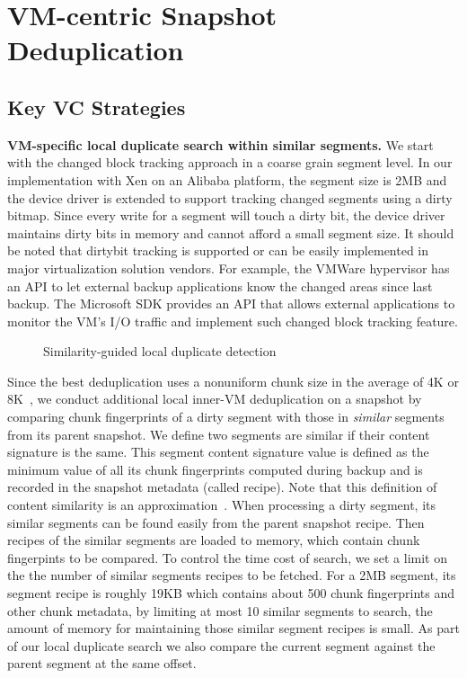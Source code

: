 \section{VM-centric Snapshot Deduplication}
\label{sect:deduplication}

\subsection{Key VC  Strategies}
\label{sect:vc-strategies}
\textbf{VM-specific local duplicate search within similar segments.}
We start with the changed block tracking approach in a coarse grain segment level.
In our implementation with Xen on an Alibaba platform, the segment size is 2MB
and the device driver is extended to support tracking changed segments using a dirty bitmap. 
Since every write for a segment will touch a dirty bit, the device driver maintains dirty bits in memory
and cannot afford a small segment size.
It should be noted that dirtybit tracking is supported or can be easily implemented in 
major virtualization solution vendors. For example,
the VMWare hypervisor has an API to let external backup applications know 
the changed areas since last backup. 
The Microsoft SDK provides an API that allows external applications to monitor 
the VM's I/O traffic and implement such changed block tracking feature.

\begin{figure}[htbp]
  \centering
  \caption{Similarity-guided local duplicate detection}
  \label{fig:local_dedup}
\end{figure}

Since the best deduplication uses a nonuniform chunk size 
in the average of 4K or 8K~\cite{Jin2009},
we conduct additional local inner-VM deduplication on a snapshot by comparing
chunk fingerprints of a dirty segment 
with those in  {\em similar} segments from its parent snapshot. 
We define two segments are similar if their content signature is the same.
This segment content signature value is defined as the minimum value of all its chunk fingerprints 
computed during backup and is recorded in the snapshot metadata (called recipe). Note that this definition of
content similarity is  an approximation~\cite{AdnriBroader}.  When processing a dirty segment,
its  similar segments can be found easily from the
parent snapshot recipe.  Then recipes of the similar segments are loaded to memory,
which contain chunk fingerpints to be compared.
To control the time cost of search, we set a limit on the the number of  similar segments recipes to be fetched. 
For a 2MB segment, its segment recipe is roughly 19KB which contains about 500 chunk fingerprints and other chunk metadata,
by limiting at most 10 similar segments to search, the amount of memory for maintaining those similar segment recipes is small.
As part of our local duplicate search we also compare the current segment
against the parent segment at the same offset.


